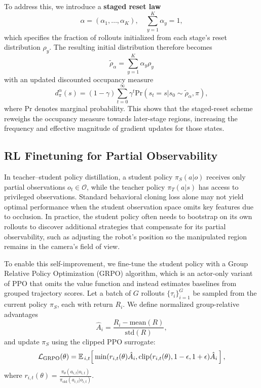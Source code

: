 To address this, we introduce a \textbf{staged reset law}
\begin{equation}
    \alpha = (\alpha_1, \dots, \alpha_K), \quad \sum_{y=1}^K \alpha_y=1,
\end{equation}
which specifies the fraction of rollouts initialized from each stage's reset distribution $\rho_y$. The resulting initial distribution therefore becomes
\begin{equation}
    \tilde{\rho}_\alpha = \sum_{y=1}^K \alpha_y \rho_y
\end{equation}
with an updated discounted occupancy measure
\begin{equation}
    d_\pi^\alpha(s)=(1-\gamma)\sum_{t=0}^\infty \gamma^t \text{Pr}(s_t=s \vert s_0 \sim \tilde{\rho}_\alpha, \pi),
\end{equation}
where $\text{Pr}$ denotes marginal probability. This shows that the staged-reset scheme reweighs the occupancy measure towards later-stage regions, increasing the frequency and effective magnitude of gradient updates for those states. 




\subsection{RL Finetuning for Partial Observability}

In teacher–student policy distillation, a student policy $\pi_S(a|o)$ receives only partial observations $o_t\in\mathcal{O}$, while the teacher policy $\pi_T(a|s)$ has access to privileged observations. Standard behavioral cloning loss alone may not yield optimal performance when the student observation space omits key features due to occlusion. In practice, the student policy often needs to bootstrap on its own rollouts to discover additional strategies that compensate for its partial observability, such as adjusting the robot's position so the manipulated region remains in the camera's field of view.

To enable this self-improvement, we fine-tune the student policy with a Group Relative Policy Optimization (GRPO) \citep{grpo2024} algorithm, which is an actor-only variant of PPO that omits the value function and instead estimates baselines from grouped trajectory scores. Let a batch of $G$ rollouts $\{\tau_i\}_{i=1}^G$ be sampled from the current policy $\pi_S$, each with return $R_i$. We define normalized group-relative advantages
\begin{equation}
    \hat{A}_i = \frac{R_i - \text{mean}(R)}{\text{std}(R)},
\end{equation}
and update $\pi_S$ using the clipped PPO surrogate:
\begin{equation}
    \mathcal{L}_{\text{GRPO}}(\theta) = \mathbb{E}_{\,i,t}\!\left[\,\min(r_{i,t}(\theta)\hat{A}_i, \\ \text{clip}(r_{i,t}(\theta), 1-\epsilon, 1+\epsilon)\hat{A}_i\,\right],
\end{equation}
where $r_{i,t}(\theta)=\frac{\pi_\theta(a_{i,t}|o_{i,t})}{\pi_\text{old}(a_{i,t}|o_{i,t})}$.

